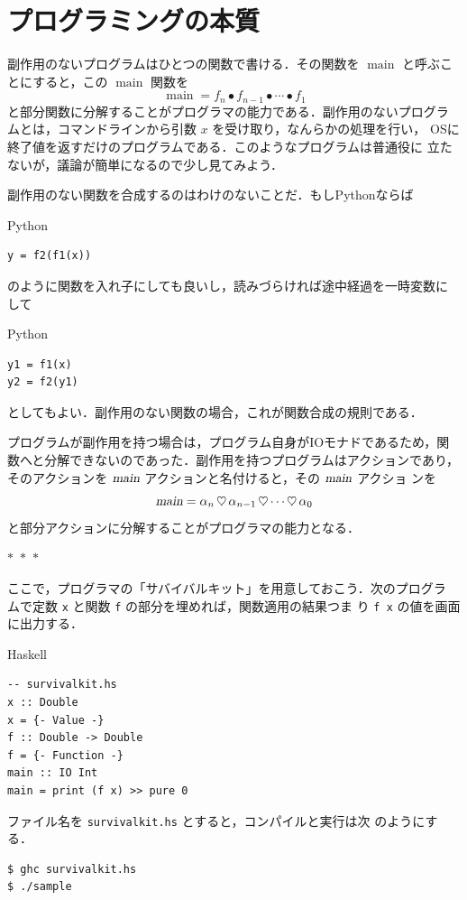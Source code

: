 \documentclass[a5paper,twoside,fleqn,draft]{jsbook}
\newcommand{\separator}{\begin{center}$*$~$*$~$*$\end{center}}
\newcommand{\programminglanguage}[1]{\textsf{#1}}
\newcommand{\haskell}{\programminglanguage{Haskell}}
\newcommand{\python}{\programminglanguage{Python}}
\newcommand{\code}[1]{\texttt{#1}}
\newcommand{\filename}[1]{\texttt{#1}}
\newenvironment{haskellcode}{\begin{itembox}[r]{\haskell}}{\end{itembox}}
\newenvironment{pythoncode}{\begin{itembox}[r]{\python}}{\end{itembox}}
\newcommand{\mSpecialFunc}[1]{\mathrm{#1}}
\DeclareMathOperator{\mMainFunc}{\mSpecialFunc{main}}
\newcommand{\mAction}[1]{\textsl{#1}}
\DeclareMathOperator{\mMain}{\mAction{main}}
\DeclareMathOperator{\mBind}{\heartsuit}
\DeclareMathOperator{\mComp}{\bullet} %
\begin{document}
\section{プログラミングの本質}

副作用のないプログラムはひとつの関数で書ける．その関数を $\mMainFunc$
と呼ぶことにすると，この $\mMainFunc$ 関数を
\begin{equation}
\mMainFunc=f_n\mComp f_{n-1}\mComp\dotsb\mComp f_1
\end{equation}
と部分関数に分解することがプログラマの能力である．副作用のないプログラ
ムとは，コマンドラインから引数 $x$ を受け取り，なんらかの処理を行い，
OSに終了値を返すだけのプログラムである．このようなプログラムは普通役に
立たないが，議論が簡単になるので少し見てみよう．

副作用のない関数を合成するのはわけのないことだ．もし\python ならば
\begin{pythoncode}
\begin{verbatim}
y = f2(f1(x))
\end{verbatim}
\end{pythoncode}
のように関数を入れ子にしても良いし，読みづらければ途中経過を一時変数に
して
\begin{pythoncode}
\begin{verbatim}
y1 = f1(x)
y2 = f2(y1)
\end{verbatim}
\end{pythoncode}
としてもよい．副作用のない関数の場合，これが関数合成の規則である．

プログラムが副作用を持つ場合は，プログラム自身がIOモナドであるため，関
数へと分解できないのであった．副作用を持つプログラムはアクションであり，
そのアクションを $\mMain$ アクションと名付けると，その $\mMain$ アクショ
ンを
\begin{equation}
\mMain=\alpha_n\mBind\alpha_{n-1}\mBind\dotsb\mBind\alpha_0
\end{equation}
と部分アクションに分解することがプログラマの能力となる．


\separator

ここで，プログラマの「サバイバルキット」を用意しておこう．次のプログラ
ムで定数 \code{x} と関数 \code{f} の部分を埋めれば，関数適用の結果つま
り \code{f x} の値を画面に出力する．
\begin{haskellcode}
\begin{verbatim}
-- survivalkit.hs
x :: Double
x = {- Value -}
f :: Double -> Double
f = {- Function -}
main :: IO Int
main = print (f x) >> pure 0
\end{verbatim}
\end{haskellcode}
ファイル名を \filename{survivalkit.hs} とすると，コンパイルと実行は次
のようにする．
\begin{verbatim}
$ ghc survivalkit.hs
$ ./sample
\end{verbatim}%
\end{document}
